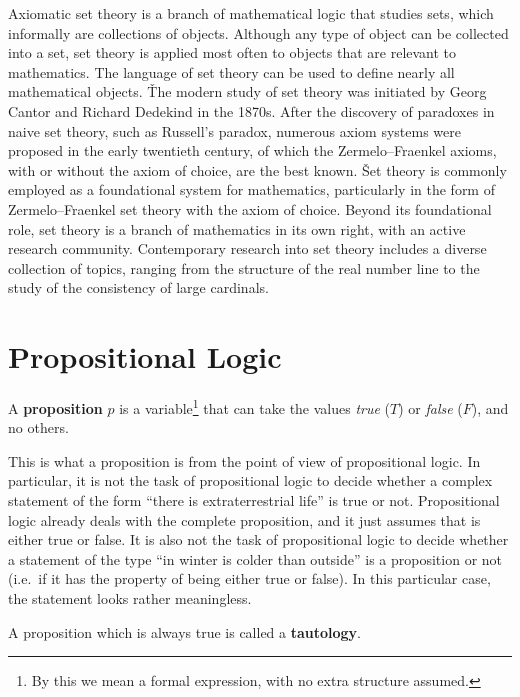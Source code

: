 Axiomatic set theory is a branch of mathematical logic that studies sets, which informally are collections of objects.
Although any type of object can be collected into a set, set theory is applied most often to objects that are
relevant to mathematics. The language of set theory can be used to define nearly all mathematical objects. \v

The modern study of set theory was initiated by Georg Cantor and Richard Dedekind in the 1870s. After the discovery
of paradoxes in naive set theory, such as Russell's paradox, numerous axiom systems were proposed in the early
twentieth century, of which the Zermelo–Fraenkel axioms, with or without the axiom of choice, are the best known. \v

Set theory is commonly employed as a foundational system for mathematics, particularly in the form of
Zermelo–Fraenkel set theory with the axiom of choice. Beyond its foundational role, set theory is a branch of
mathematics in its own right, with an active research community. Contemporary research into set theory includes a
diverse collection of topics, ranging from the structure of the real number line to the study of the consistency of
large cardinals.

\section{Propositional Logic}

\bd [Proposition]
A \textbf{proposition} $p$ is a variable\footnote{By this we mean a formal expression, with no
extra structure assumed.} that can take the values \emph{true}
($T$) or \emph{false} ($F$), and no others.
\ed

This is what a proposition is from the point of view of propositional logic. In particular, it is not the task of
propositional logic to decide whether a complex statement of the form ``there is extraterrestrial life'' is true or
not. Propositional logic already deals with the complete proposition, and it just assumes that is either true or
false. It is also not the task of propositional logic to decide whether a statement of the type ``in winter is colder
than outside'' is a proposition or not (i.e.\ if it has the property of being either true or false). In this
particular case, the statement looks rather meaningless.

\bd [Tautology]
A proposition which is always true is called a \textbf{tautology}.
\ed

